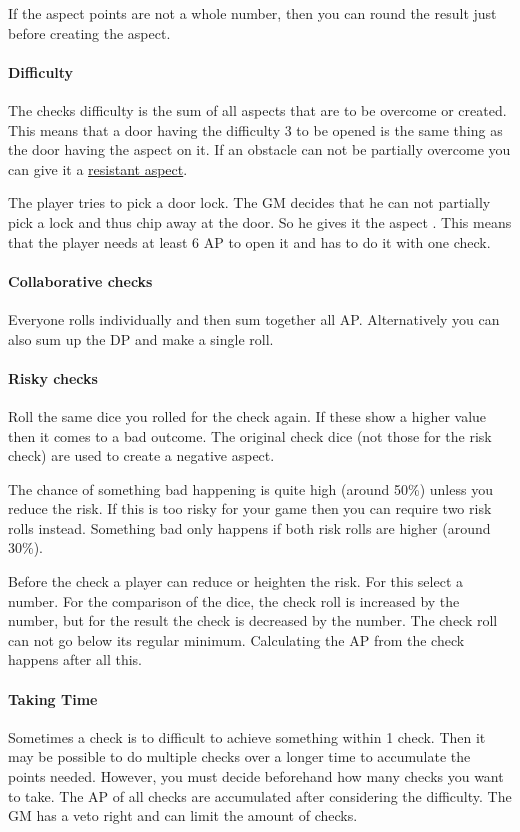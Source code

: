\documentclass[11pt]{article}
\begin{document}
{If the aspect points are not a whole number, then you can round the result just before creating the aspect.
\paragraph*{Difficulty}
\label{sec:org9123948}
The checks difficulty is the sum of all aspects that are to be overcome or created. This means that a door having the difficulty 3 to be opened is the same thing as the door having the aspect  on it. If an obstacle can not be partially overcome you can give it a \hyperref[sec:org674d41e]{resistant aspect}.

\begin{pwexample}
The player tries to pick a door lock. The GM decides that he can not partially pick a lock and thus chip away at the door. So he gives it the aspect . This means that the player needs at least 6 AP to open it and has to do it with one check.
\end{pwexample}
\paragraph*{Collaborative checks}
\label{sec:org38b2b58}
Everyone rolls individually and then sum together all AP. Alternatively you can also sum up the DP and make a single roll.
\paragraph*{Risky checks}
\label{sec:orgdb86fca}
Roll the same dice you rolled for the check again. If these show a higher value then it comes to a bad outcome. The original check dice (not those for the risk check) are used to create a negative aspect.

The chance of something bad happening is quite high (around 50\%) unless you reduce the risk. If this is too risky for your game then you can require two risk rolls instead. Something bad only happens if both risk rolls are higher (around 30\%). 

Before the check a player can reduce or heighten the risk. For this select a number. For the comparison of the dice, the check roll is increased by the number, but for the result the check is decreased by the number. The check roll can not go below its regular minimum. Calculating the AP from the check happens after all this.
\paragraph*{Taking Time}
\label{sec:org1b8816a}
Sometimes a check is to difficult to achieve something within 1 check. Then it may be possible to do multiple checks over a longer time to accumulate the points needed. However, you must decide beforehand how many checks you want to take. The AP of all checks are accumulated after considering the difficulty. The GM has a veto right and can limit the amount of checks.
}
\end{document}
